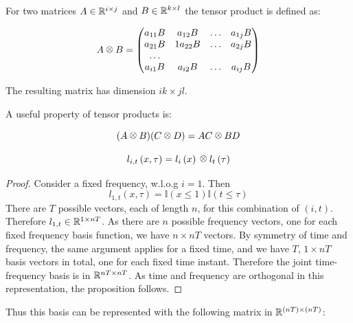 \begin{definition}
For two matrices \(A \in {\mathbb{R}}^{i \times j}\) and \(B \in {\mathbb{R}}^{k \times l}\) the tensor product is defined as:

\begin{equation}
A \kronecker B = \begin{pmatrix}
 a_{11} B & a_{12} B & \ldots & a_{1j} B \\
  a_{21} B & 1a_{22} B & \ldots & a_{2j} B\\
    \ldots  \\
     a_{i1} B & a_{i2} B & \ldots & a_{ij} B
\end{pmatrix}
\end{equation}

The resulting matrix has dimension \(ik \times jl\).

A useful property of tensor products is:

\begin{equation}
(A \kronecker B)(C \kronecker D) = AC \kronecker BD
\end{equation}

\end{definition}

\begin{proposition}
\begin{equation}
l_{i,t}\left(x, \tau\right) = l_i\left(x\right) \kronecker l_t\left(\tau\right)
\end{equation}
\begin{proof}
Consider a fixed frequency, w.l.o.g \(i=1\). Then 
\begin{equation}
l_{1,t}\left(x, \tau\right) = \mathbb{I}\left(x \leq 1\right)\mathbb{I}\left(t \leq \tau \right)
\end{equation}
There are \(T\) possible vectors, each of length \(n\), for this combination of \(\left(i,t\right)\). Therefore \(l_{1,t}\in {\mathbb{R}}^{1\times nT} \). As there are \(n\) possible frequency vectors, one for each fixed frequency basis function, we have \(n\times nT\) vectors. By symmetry of time and frequency, the same argument applies for a fixed time, and we have \(T\), \(1\times nT\) basis vectors in total, one for each fixed time instant. Therefore the joint time-frequency basis is in \({\mathbb{R}}^{nT \times nT}\). As time and frequency are orthogonal in this representation, the proposition follows.
\end{proof}
\end{proposition}


Thus this basis can be represented with the following matrix in \({\mathbb{R}}^{(nT)\times(nT)}\):

